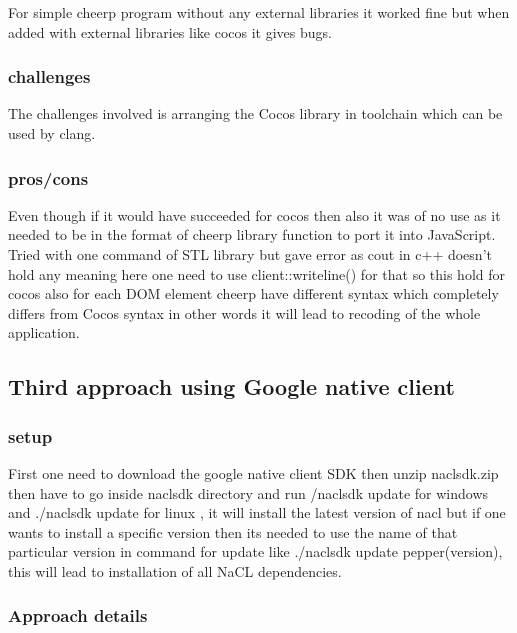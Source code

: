 \documentclass[23pt]{article}
\begin{document}
{\Large For simple cheerp program without any external libraries it worked fine but when added with external libraries like cocos it gives bugs. \par}

\subsubsection{challenges}

{\Large The challenges involved is arranging the Cocos library in toolchain which can be used by clang.}

\subsubsection{pros/cons}

{\Large Even though if it would have succeeded for cocos then also it was of no use as it needed to be in the format of cheerp library function to port it into JavaScript. Tried with one command of STL library but gave error as cout in c++ doesn’t hold any meaning here one need to use client::writeline() for that so this hold for cocos also for each DOM element cheerp have different syntax which completely differs from Cocos syntax in other words it will lead to recoding of the whole application. \par}

\subsection{Third approach using Google native client}

\subsubsection{setup}

{\Large First one need to download the google native client SDK then unzip nacl\textunderscore sdk.zip then have to go inside nacl\textunderscore sdk directory and run /naclsdk update for windows and ./naclsdk update for linux , it will install the latest version 
of nacl but if one wants to install a specific version then its needed to use the name of that particular version in command for update like ./naclsdk update pepper\textunderscore (version), this will lead to installation of all NaCL dependencies.\par}

\subsubsection{Approach details}
\end{document}
